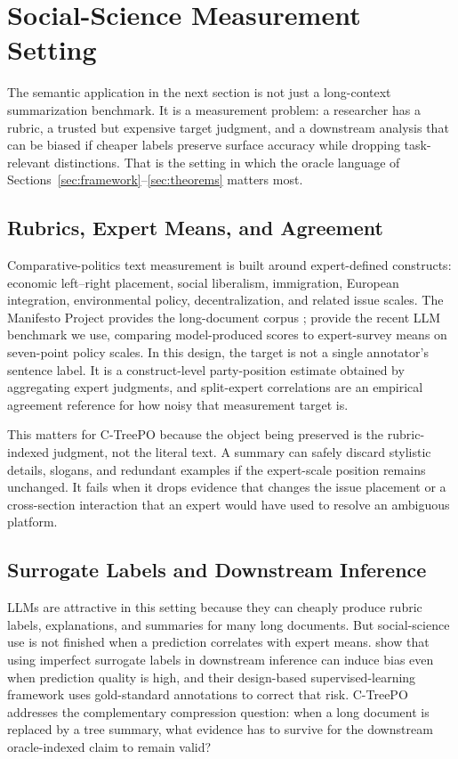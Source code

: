 \section{Social-Science Measurement Setting}\label{sec:social-measurement}

The semantic application in the next section is not just a long-context
summarization benchmark. It is a measurement problem: a researcher has a
rubric, a trusted but expensive target judgment, and a downstream analysis
that can be biased if cheaper labels preserve surface accuracy while
dropping task-relevant distinctions. That is the setting in which the
oracle language of Sections~\ref{sec:framework}--\ref{sec:theorems}
matters most.

\subsection{Rubrics, Expert Means, and Agreement}

Comparative-politics text measurement is built around expert-defined
constructs: economic left--right placement, social liberalism, immigration,
European integration, environmental policy, decentralization, and related
issue scales. The Manifesto Project provides the long-document corpus
\citep{ManifestoProject2025a}; \citet{BenoitEtAl2025} provide the recent
LLM benchmark we use, comparing model-produced scores to expert-survey
means on seven-point policy scales. In this design, the target is not a
single annotator's sentence label. It is a construct-level party-position
estimate obtained by aggregating expert judgments, and split-expert
correlations are an empirical agreement reference for how noisy that
measurement target is.

This matters for C-TreePO because the object being preserved is the
rubric-indexed judgment, not the literal text. A summary can safely discard
stylistic details, slogans, and redundant examples if the expert-scale
position remains unchanged. It fails when it drops evidence that changes
the issue placement or a cross-section interaction that an expert would
have used to resolve an ambiguous platform.

\subsection{Surrogate Labels and Downstream Inference}

LLMs are attractive in this setting because they can cheaply produce
rubric labels, explanations, and summaries for many long documents.
But social-science use is not finished when a prediction correlates with
expert means. \citet{EgamiEtAl2024} show that using imperfect surrogate
labels in downstream inference can induce bias even when prediction
quality is high, and their design-based supervised-learning framework
uses gold-standard annotations to correct that risk. C-TreePO addresses
the complementary compression question: when a long document is replaced
by a tree summary, what evidence has to survive for the downstream
oracle-indexed claim to remain valid?

